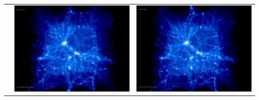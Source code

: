 \begin{itemize}
\begin{table}[p]
\begin{tabular}{l|c|c}
 & \includegraphics[scale=0.075]{r256/h70/red_st14_log1/197.jpg} & \includegraphics[scale=0.075]{r256/h100/red_st14_log1/197.jpg} \\

\end{tabular}
\end{table}
\end{itemize}
